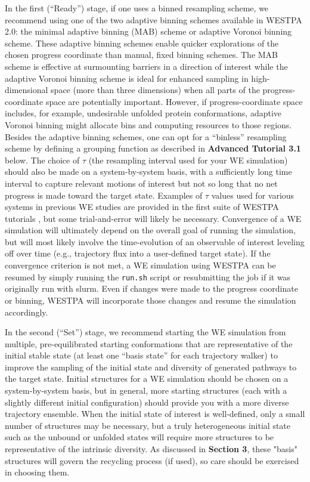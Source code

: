 In the first (“Ready”) stage, if one uses a binned resampling scheme, we recommend using one of the two adaptive binning schemes available in WESTPA 2.0: the minimal adaptive binning (MAB) scheme or adaptive Voronoi binning scheme.
These adaptive binning schemes enable quicker explorations of the chosen progress coordinate than manual, fixed binning schemes. 
The MAB scheme is effective at surmounting barriers in a direction of interest \citep{torrillo_minimal_2021} while the adaptive Voronoi binning scheme \citep{zhang_exact_2010} is ideal for enhanced sampling in high-dimensional space (more than three dimensions) when all parts of the progress-coordinate space are potentially important. 
However, if progress-coordinate space includes, for example, undesirable unfolded protein conformations, adaptive Voronoi binning might allocate bins and computing resources to those regions. 
Besides the adaptive binning schemes, one can opt for a “binless” resampling scheme by defining a grouping function as described in \textbf{Advanced Tutorial 3.1} below. 
The choice of $\tau$ (the resampling interval used for your WE simulation) should also be made on a system-by-system basis, with a sufficiently long time interval to capture relevant motions of interest but not so long that no net progress is made toward the target state. 
Examples of $\tau$ values used for various systems in previous WE studies are provided in the first suite of WESTPA tutorials \citep{bogetti_suite_2019}, but some trial-and-error will likely be necessary.
Convergence of a WE simulation will ultimately depend on the overall goal of running the simulation, but will most likely involve the time-evolution of an observable of interest leveling off over time (e.g., trajectory flux into a user-defined target state). 
If the convergence criterion is not met, a WE simulation using WESTPA can be resumed by simply running the \verb|run.sh| script or resubmitting the job if it was originally run with slurm. 
Even if changes were made to the progress coordinate or binning, WESTPA will incorporate those changes and resume the simulation accordingly.

In the second (“Set”) stage, we recommend starting the WE simulation from multiple, pre-equilibrated starting conformations that are representative of the initial stable state (at least one “basis state” for each trajectory walker) to improve the sampling of the initial state and diversity of generated pathways to the target state. 
Initial structures for a WE simulation should be chosen on a system-by-system basis, but in general, more starting structures (each with a slightly different initial configuration) should provide you with a more diverse trajectory ensemble. 
When the initial state of interest is well-defined, only a small number of structures may be necessary, but a truly heterogeneous initial state such as the unbound or unfolded states will require more structures to be representative of the intrinsic diversity.  
As discussed in \textbf{Section 3}, these "basis" structures will govern the recycling process (if used), so care should be exercised in choosing them.


